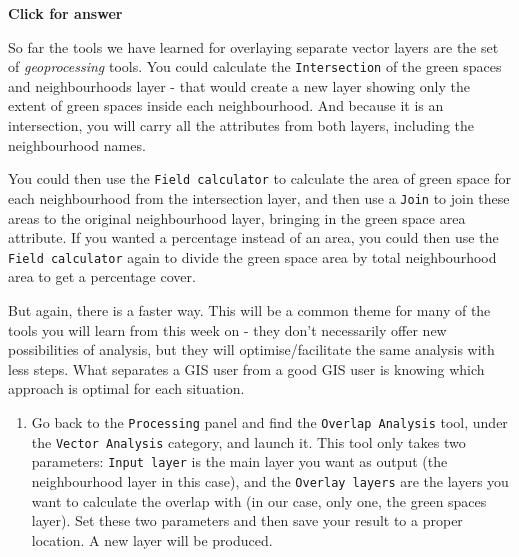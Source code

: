 \documentclass[
  letterpaper,
  DIV=11,
  numbers=noendperiod]{scrreprt}
\providecommand{\tightlist}{%
  \setlength{\itemsep}{0pt}\setlength{\parskip}{0pt}}\usepackage{longtable,booktabs,array}
\begin{document}
\begin{tcolorbox}[enhanced jigsaw, toprule=.15mm, breakable, left=2mm, colframe=quarto-callout-important-color-frame, colback=white, arc=.35mm, leftrule=.75mm, opacityback=0, rightrule=.15mm, bottomrule=.15mm]

\vspace{-3mm}\textbf{Click for answer}\vspace{3mm}

So far the tools we have learned for overlaying separate vector layers
are the set of \emph{geoprocessing} tools. You could calculate the
\texttt{Intersection} of the green spaces and neighbourhoods layer -
that would create a new layer showing only the extent of green spaces
inside each neighbourhood. And because it is an intersection, you will
carry all the attributes from both layers, including the neighbourhood
names.

You could then use the \texttt{Field\ calculator} to calculate the area
of green space for each neighbourhood from the intersection layer, and
then use a \texttt{Join} to join these areas to the original
neighbourhood layer, bringing in the green space area attribute. If you
wanted a percentage instead of an area, you could then use the
\texttt{Field\ calculator} again to divide the green space area by total
neighbourhood area to get a percentage cover.

But again, there is a faster way. This will be a common theme for many
of the tools you will learn from this week on - they don't necessarily
offer new possibilities of analysis, but they will optimise/facilitate
the same analysis with less steps. What separates a GIS user from a good
GIS user is knowing which approach is optimal for each situation.

\end{tcolorbox}

\begin{enumerate}
\def\labelenumi{(\arabic{enumi})}
\setcounter{enumi}{323}
\tightlist
\item
  Go back to the \texttt{Processing} panel and find the
  \texttt{Overlap\ Analysis} tool, under the \texttt{Vector\ Analysis}
  category, and launch it. This tool only takes two parameters:
  \texttt{Input\ layer} is the main layer you want as output (the
  neighbourhood layer in this case), and the \texttt{Overlay\ layers}
  are the layers you want to calculate the overlap with (in our case,
  only one, the green spaces layer). Set these two parameters and then
  save your result to a proper location. A new layer will be produced.
\end{enumerate}
\end{document}
